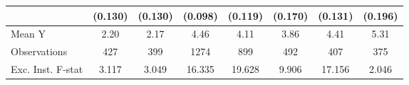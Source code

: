 {\begin{tabular}{l*{7}{c}}
            &     (0.130)         &     (0.130)         &     (0.098)         &     (0.119)         &     (0.170)         &     (0.131)         &     (0.196)         \\
\midrule
Mean Y      &        2.20         &        2.17         &        4.46         &        4.11         &        3.86         &        4.41         &        5.31         \\
Observations&         427         &         399         &        1274         &         899         &         492         &         407         &         375         \\
Exc. Inst. F-stat&       3.117         &       3.049         &      16.335         &      19.628         &       9.906         &      17.156         &       2.046         \\
\bottomrule
\end{tabular}
}
